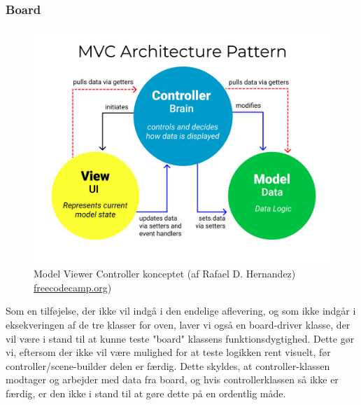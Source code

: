 \subsubsection{Board}
\begin{figure}[H]
    \centering
    \caption{Model Viewer Controller konceptet (af Rafael D. Hernandez) \href{https://www.freecodecamp.org/news/the-model-view-controller-pattern-mvc-architecture-and-frameworks-explained/}{freecodecamp.org})}\label{fig:my_label}
    \includegraphics[width=.5\textwidth]{Graphics/MVC3.png}
\end{figure}

Som en tilføjelse, der ikke vil indgå i den endelige aflevering, og som ikke indgår i eksekveringen af de tre klasser for oven, laver vi også en board-driver klasse, der vil være i stand til at kunne teste "board" klassens funktionsdygtighed. Dette gør vi, eftersom der ikke vil være mulighed for at teste logikken rent visuelt, før controller/scene-builder delen er færdig. Dette skyldes, at controller-klassen modtager og arbejder med data fra board, og hvis controllerklassen så ikke er færdig, er den ikke i stand til at gøre dette på en ordentlig måde.